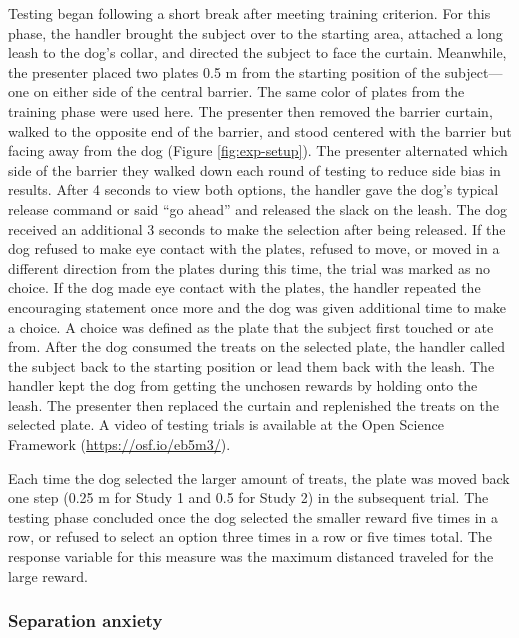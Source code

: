 \documentclass[
  pub,floatsintext]{apa6}
\begin{document}
Testing began following a short break after meeting training criterion. For this phase, the handler brought the subject over to the starting area, attached a long leash to the dog's collar, and directed the subject to face the curtain. Meanwhile, the presenter placed two plates 0.5 m from the starting position of the subject---one on either side of the central barrier. The same color of plates from the training phase were used here. The presenter then removed the barrier curtain, walked to the opposite end of the barrier, and stood centered with the barrier but facing away from the dog (Figure \ref{fig:exp-setup}). The presenter alternated which side of the barrier they walked down each round of testing to reduce side bias in results. After 4 seconds to view both options, the handler gave the dog's typical release command or said ``go ahead'' and released the slack on the leash. The dog received an additional 3 seconds to make the selection after being released. If the dog refused to make eye contact with the plates, refused to move, or moved in a different direction from the plates during this time, the trial was marked as no choice. If the dog made eye contact with the plates, the handler repeated the encouraging statement once more and the dog was given additional time to make a choice. A choice was defined as the plate that the subject first touched or ate from. After the dog consumed the treats on the selected plate, the handler called the subject back to the starting position or lead them back with the leash. The handler kept the dog from getting the unchosen rewards by holding onto the leash. The presenter then replaced the curtain and replenished the treats on the selected plate. A video of testing trials is available at the Open Science Framework (\url{https://osf.io/eb5m3/}).

Each time the dog selected the larger amount of treats, the plate was moved back one step (0.25 m for Study 1 and 0.5 for Study 2) in the subsequent trial. The testing phase concluded once the dog selected the smaller reward five times in a row, or refused to select an option three times in a row or five times total. The response variable for this measure was the maximum distanced traveled for the large reward.

\hypertarget{separation-anxiety}{%
\subsubsection{Separation anxiety}\label{separation-anxiety}}
\end{document}
